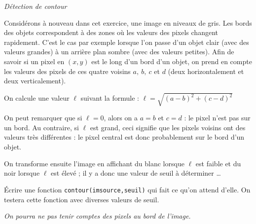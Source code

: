 \documentclass[10pt,a4paper,pdftex]{book}
\begin{document}
\begin{exoc}{\textit{Détection de contour}}

Considérons à nouveau dans cet exercice, une image en niveaux de gris. Les bords des objets correspondent à des zones où les valeurs des pixels changent rapidement. C'est le cas par exemple lorsque l'on passe d'un objet clair (avec des valeurs
grandes) à un arrière plan sombre (avec des valeurs petites).
Afin de savoir si un pixel en $({x},{y})$ est le long d'un bord d'un objet, on prend en compte les valeurs des pixels de ces quatre voisins $a,\ b,\ c$ et $d$ (deux horizontalement et deux verticalement).
\begin{center}
\end{center} 

On calcule une valeur $\ell$ suivant la formule : $\ell = \sqrt{(a-b)^2+(c-d)^2}$

\smallskip
On peut remarquer que si $\ell=0$, alors on a $a=b$ et $c = d$ : le pixel n'est pas sur un bord. Au contraire, si $\ell$ est grand, ceci signifie que les pixels voisins ont des valeurs très différentes : le pixel central est donc probablement sur le bord d'un
objet.

\smallskip
On transforme ensuite l'image en affichant du blanc lorsque $\ell$ est faible et du noir lorsque $\ell$ est élevé ; il y a donc une valeur de seuil à déterminer \ldots


Écrire une fonction \texttt{contour(imsource,seuil)} qui fait ce qu'on attend d'elle. On testera cette fonction avec diverses valeurs de seuil.


\textit{On pourra ne pas tenir comptes des pixels au bord de l'image.}
\end{exoc}
\end{document}
